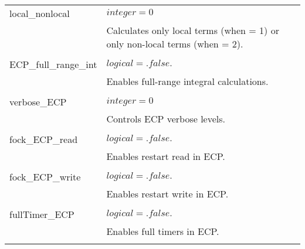 \begin{Spacing}{1.0}
\begin{longtable}{ p{} p{} }
      local\_nonlocal & $ integer = 0 $ \\
      & Calculates only local terms (when = 1) or
      only non-local terms (when = 2).\\
      \\
   
      ECP\_full\_range\_int & $ logical = .false. $ \\
      & Enables full-range integral calculations.\\
      \\
   
      verbose\_ECP & $ integer = 0 $ \\
      & Controls ECP verbose levels.\\
      \\
   
      fock\_ECP\_read & $ logical = .false. $ \\
      & Enables restart read in ECP.\\
      \\
   
      fock\_ECP\_write & $ logical = .false. $ \\
      & Enables restart write in ECP.\\
      \\
   
      fullTimer\_ECP & $ logical = .false. $ \\
      & Enables full timers in ECP.\\
      \\
   
   \end{longtable}
\end{Spacing}




